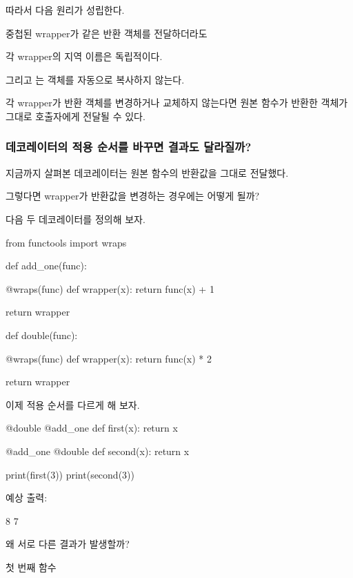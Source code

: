 따라서 다음 원리가 성립한다.

\begin{dhksmry}[centered]
중첩된 wrapper가 같은 반환 객체를 전달하더라도

각 wrapper의 지역 이름은 독립적이다.
\end{dhksmry}

그리고 는 객체를 자동으로 복사하지 않는다.

각 wrapper가 반환 객체를 변경하거나 교체하지 않는다면 원본 함수가 반환한 객체가 그대로 호출자에게 전달될 수 있다.

\subsubsection{데코레이터의 적용 순서를 바꾸면 결과도 달라질까?}

지금까지 살펴본 데코레이터는 원본 함수의 반환값을 그대로 전달했다.

그렇다면 wrapper가 반환값을 변경하는 경우에는 어떻게 될까?

다음 두 데코레이터를 정의해 보자.

\begin{dhkcode}
from functools import wraps

def add_one(func):

    @wraps(func)
    def wrapper(x):
        return func(x) + 1

    return wrapper


def double(func):

    @wraps(func)
    def wrapper(x):
        return func(x) * 2

    return wrapper
\end{dhkcode}

이제 적용 순서를 다르게 해 보자.

\begin{dhkcode}
@double
@add_one
def first(x):
    return x


@add_one
@double
def second(x):
    return x


print(first(3))
print(second(3))
\end{dhkcode}

예상 출력:

\begin{dhkzsh}
8
7
\end{dhkzsh}

왜 서로 다른 결과가 발생할까?

\begin{dhknote}
\begin{dhksmry}[centered]
첫 번째 함수
\end{dhksmry}
\end{dhknote}

